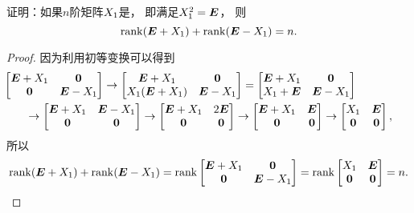 \begin{example}
证明：如果\(n\)阶矩阵\(X_1\)是，
即满足\(X_1^2=\boldsymbol{E}\)，
则\[
	\rank(\boldsymbol{E}+X_1)+\rank(\boldsymbol{E}-X_1)=n.
\]
\begin{proof}
因为利用初等变换可以得到\begin{align*}
	&\hspace{-20pt}
	\begin{bmatrix}
		\E+\A & \z \\
		\z & \E-\A
	\end{bmatrix}
	\to \begin{bmatrix}
		\E+\A & \z \\
		\A(\E+\A) & \E-\A
	\end{bmatrix}
	= \begin{bmatrix}
		\E+\A & \z \\
		\A+\E & \E-\A
	\end{bmatrix} \\
	&\to \begin{bmatrix}
		\E+\A & \E-\A \\
		\z & \z
	\end{bmatrix}
	\to \begin{bmatrix}
		\E+\A & 2\E \\
		\z & \z
	\end{bmatrix}
	\to \begin{bmatrix}
		\E+\A & \E \\
		\z & \z
	\end{bmatrix}
	\to \begin{bmatrix}
		\A & \E \\
		\z & \z
	\end{bmatrix},
\end{align*}
所以\[
	\rank(\boldsymbol{E}+X_1)+\rank(\boldsymbol{E}-X_1)
	=\rank\begin{bmatrix}
		\boldsymbol{E}+X_1 & \boldsymbol{0} \\
		\boldsymbol{0} & \boldsymbol{E}-X_1
	\end{bmatrix}
	= \rank\begin{bmatrix}
		X_1 & \boldsymbol{E} \\
		\boldsymbol{0} & \boldsymbol{0}
	\end{bmatrix}
	= n.
	\qedhere
\]
\end{proof}
\end{example}

